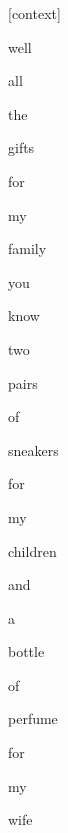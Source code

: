 \documentclass[varwidth]{standalone}
\begin{document}
\begin{CJK*}{UTF8}{gbsn}
{\setlength{\fboxsep}{0pt}\colorbox{white!0}{\parbox{0.9\textwidth}{
\colorbox{red!6.1167156673036516e-06}{\strut [context]} \colorbox{red!0.05275547131896019}{\strut well} \colorbox{red!0.04311542958021164}{\strut all} \colorbox{red!0.004450779873877764}{\strut the} \colorbox{red!0.5764224529266357}{\strut gifts} \colorbox{red!3.279171943664551}{\strut for} \colorbox{red!0.9032529592514038}{\strut my} \colorbox{red!3.7803502082824707}{\strut family} \colorbox{red!0.12724676728248596}{\strut you} \colorbox{red!0.5108761191368103}{\strut know} \colorbox{red!48.63581466674805}{\strut two} \colorbox{red!4.088646411895752}{\strut pairs} \colorbox{red!0.7456744313240051}{\strut of} \colorbox{red!0.1571052521467209}{\strut sneakers} \colorbox{red!2.826671838760376}{\strut for} \colorbox{red!0.6300679445266724}{\strut my} \colorbox{red!0.7565749287605286}{\strut children} \colorbox{red!1.683807373046875}{\strut and} \colorbox{red!1.4024569988250732}{\strut a} \colorbox{red!1.7733584642410278}{\strut bottle} \colorbox{red!0.23970554769039154}{\strut of} \colorbox{red!1.1930233240127563}{\strut perfume} \colorbox{red!3.716219186782837}{\strut for} \colorbox{red!0.9564543962478638}{\strut my} \colorbox{red!21.916778564453125}{\strut wife} 
}}}
\end{CJK*}
\end{document}
